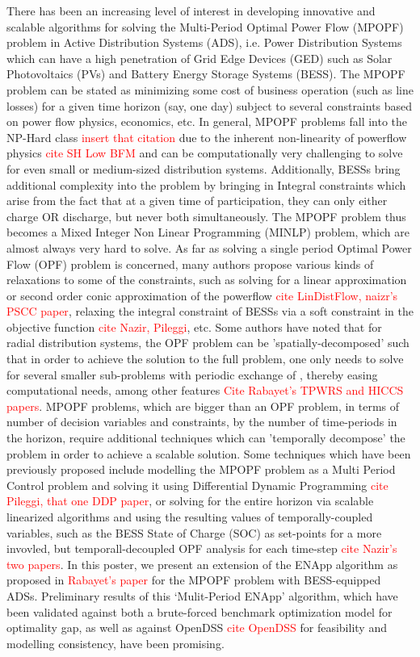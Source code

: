 \documentclass[conference]{IEEEtran} %
\begin{document}
There has been an increasing level of interest in developing innovative and scalable algorithms for solving the Multi-Period Optimal Power Flow (MPOPF) problem in Active Distribution Systems (ADS), i.e. Power Distribution Systems which can have a high penetration of Grid Edge Devices (GED) such as Solar Photovoltaics (PVs) and Battery Energy Storage Systems (BESS). The MPOPF problem can be stated as minimizing some cost of business operation (such as line losses) for a given time horizon (say, one day) subject to several constraints based on power flow physics, economics, etc. In general, MPOPF problems fall into the NP-Hard class \textcolor{red}{insert that citation} due to the inherent non-linearity of powerflow physics \textcolor{red}{cite SH Low BFM} and can be computationally very challenging to solve for even small or medium-sized distribution systems. Additionally, BESSs bring additional complexity into the problem by bringing in Integral constraints which arise from the fact that at a given time of participation, they can only either charge OR discharge, but never both simultaneously. The MPOPF problem thus becomes a Mixed Integer Non Linear Programming (MINLP) problem, which are almost always very hard to solve. As far as solving a single period Optimal Power Flow (OPF) problem is concerned, many authors propose various kinds of relaxations to some of the constraints, such as solving for a linear approximation or second order conic approximation of the powerflow \textcolor{red}{cite LinDistFlow, naizr's PSCC paper}, relaxing the integral constraint of BESSs via a soft constraint in the objective function \textcolor{red}{cite Nazir, Pileggi}, etc. Some authors have noted that for radial distribution systems, the OPF problem can be 'spatially-decomposed' such that in order to achieve the solution to the full problem, one only needs to solve for several smaller sub-problems with periodic exchange of , thereby easing computational needs, among other features \textcolor{red}{Cite Rabayet's TPWRS and HICCS papers}. MPOPF problems, which are bigger than an OPF problem, in terms of number of decision variables and constraints, by the number of time-periods in the horizon, require additional techniques which can 'temporally decompose' the problem in order to achieve a scalable solution. Some techniques which have been previously proposed include modelling the MPOPF problem as a Multi Period Control problem and solving it using Differential Dynamic Programming \textcolor{red}{cite Pileggi, that one DDP paper}, or solving for the entire horizon via scalable linearized algorithms and using the resulting values of temporally-coupled variables, such as the BESS State of Charge (SOC) as set-points for a more invovled, but temporall-decoupled OPF analysis for each time-step \textcolor{red}{cite Nazir's two papers}.
In this poster, we present an extension of the ENApp algorithm as proposed in \textcolor{red}{Rabayet's paper} for the MPOPF problem with BESS-equipped ADSs. Preliminary results of this `Mulit-Period ENApp' algorithm, which have been validated against both a brute-forced benchmark optimization model for optimality gap, as well as against OpenDSS \textcolor{red}{cite OpenDSS} for feasibility and modelling consistency, have been promising. 


\cite{bfm01,Nazir2018Jun,Nazir2019Jun,ddp_sugar_01,Qian2014Jul}




\end{document}
